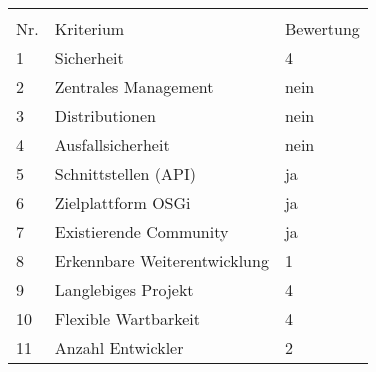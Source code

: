 \begin{table}[H]
\begin{framed}
\begin{tabular}{l|l|l|l}
  \multicolumn{4}{l}{} \\
  
  Nr. &  \multicolumn{2}{l|}{Kriterium} & Bewertung \\
  \midrule
  1 & \multicolumn{2}{l|}{Sicherheit}
  & 4 \\
  
  2 & \multicolumn{2}{l|}{Zentrales Management}
  & nein \\
  
  3 & \multicolumn{2}{l|}{Distributionen}
  & nein \\
  
  4 & \multicolumn{2}{l|}{Ausfallsicherheit}
  & nein \\
  
  5 & \multicolumn{2}{l|}{Schnittstellen (\ac{API})}
  & ja \\
  
  6 & \multicolumn{2}{l|}{Zielplattform OSGi}
  & ja \\
  
  7 & \multicolumn{2}{l|}{Existierende Community}
  & ja \\
  
  8 & \multicolumn{2}{l|}{Erkennbare Weiterentwicklung}
  & 1 \\
  
  9 & \multicolumn{2}{l|}{Langlebiges Projekt}
  & 4 \\
  
  10 & \multicolumn{2}{l|}{Flexible Wartbarkeit}
  & 4 \\
  
  11 & \multicolumn{2}{l|}{Anzahl Entwickler}
  & 2 \\
  \bottomrule
 \end{tabular}
 \label{tab:rating_obr}
 \end{framed}
\end{table}

